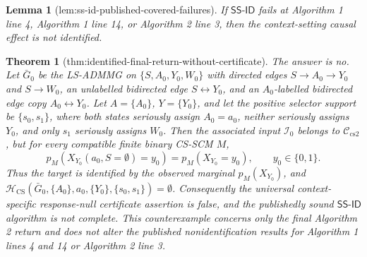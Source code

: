 \documentclass{article}
\newtheorem{theorem}{Theorem}
\newtheorem{lemma}{Lemma}
\begin{document}
\begin{lemma}[lem:ss-id-published-covered-failures]\label{lem:ss-id-published-covered-failures}
If \(\mathsf{SS\text{-}ID}\) fails at Algorithm 1 line 4, Algorithm 1 line 14, or Algorithm 2 line 3, then the context-setting causal effect is not identified.
\end{lemma}

\begin{theorem}[thm:identified-final-return-without-certificate]\label{thm:identified-final-return-without-certificate}
The answer is no. Let \(\bar G_0\) be the LS-ADMMG on \(\{S,A_0,Y_0,W_0\}\) with directed edges \(S\to A_0\to Y_0\) and \(S\to W_0\), an unlabelled bidirected edge \(S\leftrightarrow Y_0\), and an \(A_0\)-labelled bidirected edge copy \(A_0\leftrightarrow Y_0\). Let \(A=\{A_0\}\), \(Y=\{Y_0\}\), and let the positive selector support be \(\{s_0,s_1\}\), where both states seriously assign \(A_0=a_0\), neither seriously assigns \(Y_0\), and only \(s_1\) seriously assigns \(W_0\). Then the associated input \(\mathcal I_0\) belongs to \(\mathcal C_{\mathrm{cs2}}\), but for every compatible finite binary CS-SCM \(M\),
\[p_M(X_{Y_0}(a_0,S=\emptyset)=y_0)=p_M(X_{Y_0}=y_0),\qquad y_0\in\{0,1\}.\]
Thus the target is identified by the observed marginal \(p_M(X_{Y_0})\), and \(\mathcal H_{\mathrm{CS}}(\bar G_0,\{A_0\},a_0,\{Y_0\},\{s_0,s_1\})=\emptyset\). Consequently the universal context-specific response-null certificate assertion is false, and the publishedly sound \(\mathsf{SS\text{-}ID}\) algorithm is not complete. This counterexample concerns only the final Algorithm 2 return and does not alter the published nonidentification results for Algorithm 1 lines 4 and 14 or Algorithm 2 line 3.
\end{theorem}
\end{document}
